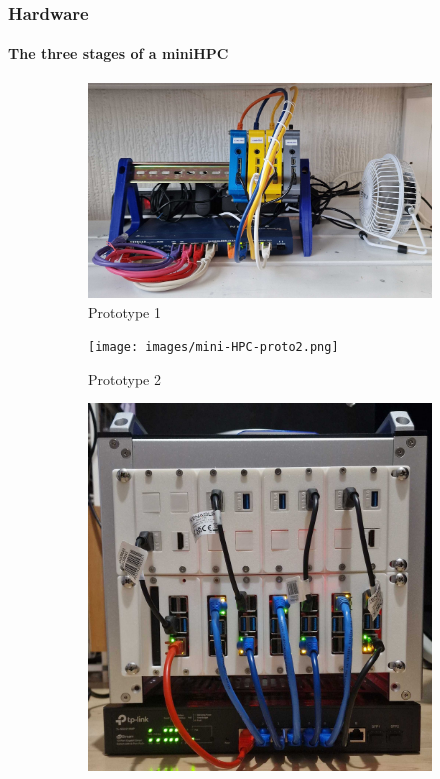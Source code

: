 \begin{frame}
	\frametitle{Hardware}
	\framesubtitle{The three stages of a miniHPC}
	
	\begin{figure}
		\centering
		\begin{subfigure}[b]{0.24\textwidth}
			\centering
			\includegraphics[width=\textwidth]{images/mini-HPC-proto1.png}
			\caption{Prototype 1}
			\label{fig:2.a}
		\end{subfigure}
		\hfill
		\begin{subfigure}[b]{0.24\textwidth}
			\centering
			\texttt{[image: images/mini-HPC-proto2.png]}
			\caption{Prototype 2}
			\label{fig:2.b}
		\end{subfigure}
		\hfill
		\begin{subfigure}[b]{0.24\textwidth}
			\centering
			\includegraphics[width=\textwidth]{images/mini-HPC-proto3.png}

\end{subfigure}
\end{figure}
\end{frame}
